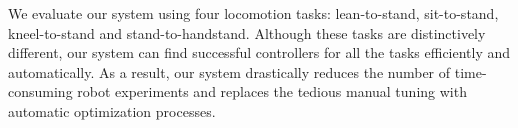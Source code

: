 We evaluate our system using four locomotion tasks: lean-to-stand, sit-to-stand, kneel-to-stand and stand-to-handstand. Although these tasks are distinctively different, our system can find successful controllers for all the tasks efficiently and automatically. As a result, our system drastically reduces the number of time-consuming robot experiments and replaces the tedious manual tuning with automatic optimization processes.
